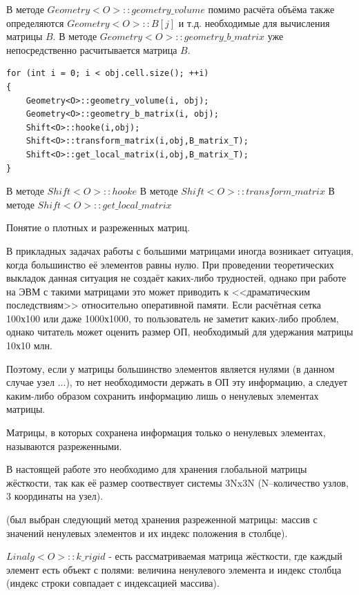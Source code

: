 \documentclass[a4paper,12pt]{article}
\begin{document}
В методе $Geometry<O>::geometry\_volume$ помимо расчёта объёма также определяются $Geometry<O>::B[j]$ и т.д. необходимые для вычисления матрицы $B$.
В методе $Geometry<O>::geometry\_b\_matrix$ уже непосредственно расчитывается матрица $B$.


\begin{scriptsize}
\begin{verbatim}
for (int i = 0; i < obj.cell.size(); ++i)
{
    Geometry<O>::geometry_volume(i, obj);
    Geometry<O>::geometry_b_matrix(i, obj);
    Shift<O>::hooke(i,obj);
    Shift<O>::transform_matrix(i,obj,B_matrix_T);
    Shift<O>::get_local_matrix(i,obj,B_matrix_T);
}
\end{verbatim}
\end{scriptsize} 

В методе $Shift<O>::hooke$
В методе $Shift<O>::transform\_matrix$
В методе $Shift<O>::get\_local\_matrix$

Понятие о плотных и разреженных матриц.

В прикладных задачах работы с большими матрицами иногда возникает ситуация, когда большинство её элементов равны нулю. При проведении теоретических выкладок данная ситуация не создаёт каких-либо трудностей, однако при работе на ЭВМ с такими матрицами это может приводить к <<драматическим последствиям>> относительно оперативной памяти. Если расчётная сетка 100х100 или даже 1000х1000, то пользователь не заметит каких-либо проблем, однако читатель может оценить размер ОП, необходимый для удержания матрицы 10х10 млн.

Поэтому, если у матрицы большинство элементов является нулями (в данном случае узел ...), то нет необходимости держать в ОП эту информацию, а следует каким-либо образом сохранить информацию лишь о ненулевых элементах матрицы. 

Матрицы, в которых сохранена информация только о ненулевых элементах, называются разреженными.

В настоящей работе это необходимо для хранения глобальной матрицы жёсткости, так как её размер соотвествует системы 3Nx3N (N--количество узлов, 3 координаты на узел).

(был выбран следующий метод хранения разреженной матрицы: массив с значений ненулевых элементов и их индекс положения в столбце). 


$Linalg<O>::k\_rigid$ - есть рассматриваемая матрица жёсткости, где каждый элемент есть объект с полями: величина ненулевого элемента и индекс столбца (индекс строки совпадает с индексацией массива).
\end{document}
